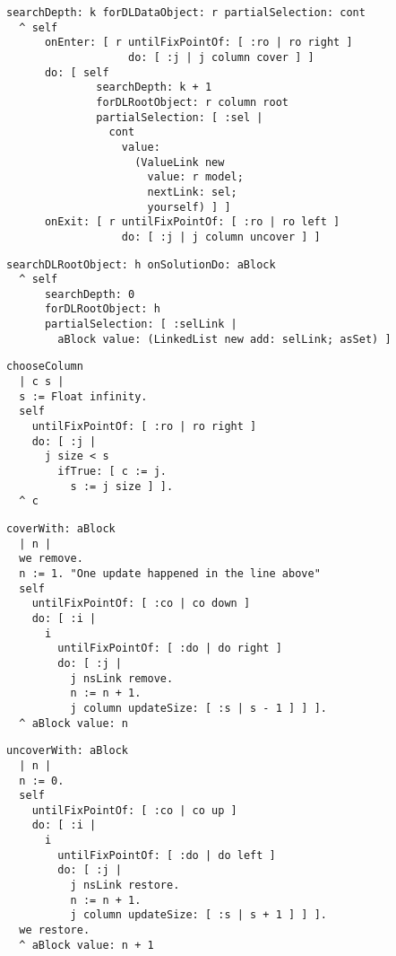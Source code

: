\documentclass{beamer}
\begin{document}
\begin{frame}[fragile]
\begin{verbatim}
searchDepth: k forDLDataObject: r partialSelection: cont
  ^ self
      onEnter: [ r untilFixPointOf: [ :ro | ro right ] 
                   do: [ :j | j column cover ] ]
      do: [ self
              searchDepth: k + 1
              forDLRootObject: r column root
              partialSelection: [ :sel | 
                cont
                  value:
                    (ValueLink new
                      value: r model;
                      nextLink: sel;
                      yourself) ] ]
      onExit: [ r untilFixPointOf: [ :ro | ro left ] 
                  do: [ :j | j column uncover ] ]
\end{verbatim}
\end{frame}
  
\begin{frame}[fragile]
\begin{verbatim}
searchDLRootObject: h onSolutionDo: aBlock
  ^ self
      searchDepth: 0
      forDLRootObject: h
      partialSelection: [ :selLink | 
        aBlock value: (LinkedList new add: selLink; asSet) ]
\end{verbatim}
\vfill
\begin{verbatim}
chooseColumn
  | c s |
  s := Float infinity.
  self
    untilFixPointOf: [ :ro | ro right ]
    do: [ :j | 
      j size < s
        ifTrue: [ c := j.
          s := j size ] ].
  ^ c
\end{verbatim}
\end{frame}

\begin{frame}[fragile]
\begin{verbatim}
coverWith: aBlock
  | n |
  we remove.
  n := 1. "One update happened in the line above"
  self
    untilFixPointOf: [ :co | co down ]
    do: [ :i | 
      i
        untilFixPointOf: [ :do | do right ]
        do: [ :j | 
          j nsLink remove.
          n := n + 1.
          j column updateSize: [ :s | s - 1 ] ] ].
  ^ aBlock value: n
\end{verbatim}
\end{frame}

\begin{frame}[fragile]
\begin{verbatim}
uncoverWith: aBlock
  | n |
  n := 0.
  self
    untilFixPointOf: [ :co | co up ]
    do: [ :i | 
      i
        untilFixPointOf: [ :do | do left ]
        do: [ :j | 
          j nsLink restore.
          n := n + 1.
          j column updateSize: [ :s | s + 1 ] ] ].
  we restore.
  ^ aBlock value: n + 1
\end{verbatim}
\end{frame}
\end{document}
